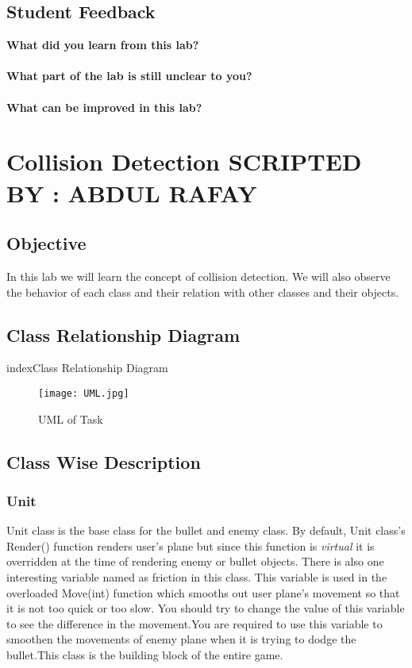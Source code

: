 \documentclass[11pt,fleqn]{book} %
\begin{document}
\newpage
\section{Student Feedback}
\textbf{What did you learn from this lab?}\\
\noindent\fbox{\parbox{\textwidth}{
  }
}\\
\textbf{What part of the lab is still unclear to you?}\\
\noindent\fbox{\parbox{\textwidth}{
  }
}\\
\textbf{What can be improved in this lab?}\\ 
\noindent\fbox{\parbox{\textwidth}{
  }
}

\newpage
{} %

\chapter{Collision Detection \hspace{38mm} {\textsc{\small SCRIPTED BY : ABDUL RAFAY}}}
\section{Objective}
In this lab we will learn the concept of collision detection. We will also observe the behavior of each class and their relation with other classes and their objects.
\section{Class Relationship Diagram}index{Class Relationship Diagram}
\begin{figure}[h]
  \centering\texttt{[image: UML.jpg]}
  \caption{UML of Task}
\end{figure}
\newpage
\section{Class Wise Description}
\subsection{Unit}
Unit class is the base class for the bullet and enemy class. By default, Unit class's Render() function renders user's plane but since this function is \emph{virtual} it is overridden at the time of rendering enemy or bullet objects. There is also one interesting variable named as friction in this class. This variable is used in the overloaded Move(int) function which smooths out user plane's movement so that it is not too quick or too slow. You should try to change the value of this variable to see the difference in the movement.You are required to use this variable to smoothen the movements of enemy plane when it is trying to dodge the bullet.This class is the building block of the entire game.
\end{document}
